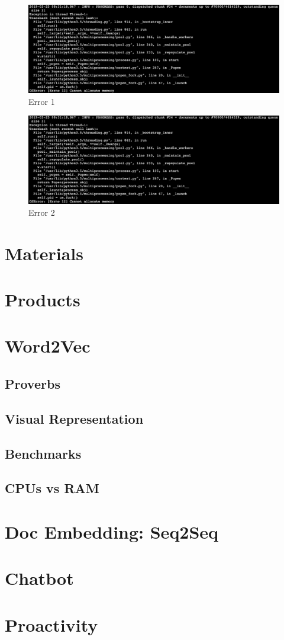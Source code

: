 \begin{figure}[htbp]
\centering
\includegraphics[width=\linewidth]{99-imgs/gensim_memory_allocation_error}
\caption{Error 1}
\label{fig:error-1}
\end{figure}

\begin{figure}[htbp]
\centering
\includegraphics[width=\linewidth]{99-imgs/gensim_memory_allocation_error}
\caption{Error 2}
\label{fig:error-2}
\end{figure}

\section{Materials}

\section{Products}

\section{Word2Vec}
\subsection{Proverbs}
\subsection{Visual Representation}
\subsection{Benchmarks}
\subsection{CPUs vs RAM}

\section{Doc Embedding: Seq2Seq}
\section{Chatbot}
\section{Proactivity}



